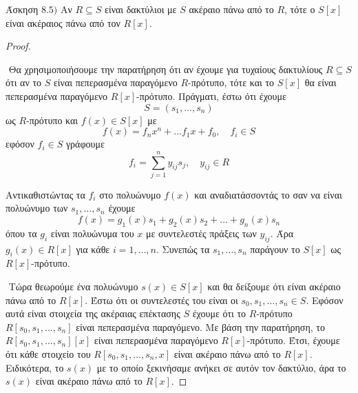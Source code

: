 \documentclass[oneside,a4paper]{article}
\begin{document}
\noindent Άσκηση $8.5)$ Αν $R\subseteq S$ είναι δακτύλιοι με $S$ ακέραιο πάνω από το $R$, τότε ο $S[x]$ είναι ακέραιος πάνω από τον $R[x]$.
\vspace*{1cm}
\begin{proof} $ $

	$ $\newline
	Θα χρησιμοποιήσουμε την παρατήρηση ότι αν έχουμε για τυχαίους δακτυλίους $R\subseteq S$ ότι αν το $S$ είναι πεπερασμένα παραγόμενο $R$-πρότυπο, τότε και το $S[x]$ θα είναι πεπερασμένα παραγόμενο $R[x]$-πρότυπο. Πράγματι, έστω ότι έχουμε $$S = (s_1,\ldots,s_n)$$ ως $R$-πρότυπο και $f(x) \in S[x]$ με $$f(x) = f_n x^n + \ldots f_1 x + f_0, \quad f_i \in S$$ εφόσον $f_i \in S$ γράφουμε $$f_i = \sum\limits_{j=1}^n y_{ij}s_j, \quad y_{ij} \in R$$

	$ $\newline Αντικαθιστώντας τα $f_i$ στο πολυώνυμο $f(x)$ και αναδιατάσσοντάς το σαν να είναι πολυώνυμο των $s_1,\ldots,s_n$ έχουμε $$f(x) = g_1(x) s_1 + g_2 (x) s_2 + \ldots + g_n (x) s_n$$ όπου τα $g_i$ είναι πολυώνυμα του $x$ με συντελεστές πράξεις των $y_{ij}$. Άρα $g_i(x) \in R[x]$ για κάθε $i=1,\ldots,n$. Συνεπώς τα $s_1,\ldots,s_n$ παράγουν το $S[x]$ ως $R[x]$-πρότυπο.

	$ $\newline
	Τώρα θεωρούμε ένα πολυώνυμο $s(x) \in S[x]$ και θα δείξουμε ότι είναι ακέραιο πάνω από το $R[x]$. Έστω ότι οι συντελεστές του είναι οι $s_0,s_1,\ldots,s_n \in S$. Εφόσον αυτά είναι στοιχεία της ακέραιας επέκτασης $S$ έχουμε ότι το $R$-πρότυπο $R[s_0,s_1,\ldots,s_n]$ είναι πεπερασμένα παραγόμενο. Με βάση την παρατήρηση, το $R[s_0,s_1,\ldots,s_n][x]$ είναι πεπερασμένα παραγόμενο $R[x]$-πρότυπο. Έτσι, έχουμε ότι κάθε στοιχείο του $R[s_0,s_1,\ldots,s_n,x]$ είναι ακέραιο πάνω από το $R[x]$. Ειδικότερα, το $s(x)$ με το οποίο ξεκινήσαμε ανήκει σε αυτόν τον δακτύλιο, άρα το $s(x)$ είναι ακέραιο πάνω από το $R[x]$.

\end{proof}

\pagebreak
\end{document}
